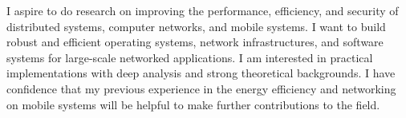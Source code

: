 I aspire to do research on improving the performance, efficiency, and security of distributed systems, computer networks, and mobile systems. I want to build robust and efficient operating systems, network infrastructures, and software systems for large-scale networked applications. I am interested in practical implementations with deep analysis and strong theoretical backgrounds. I have confidence that my previous experience in the energy efficiency and networking on mobile systems will be helpful to make further contributions to the field.